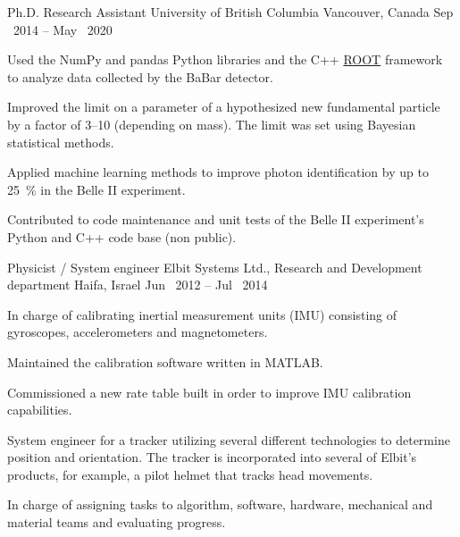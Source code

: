 

\begin{cventries}

    \cventryWithTags
    {Ph.D. Research Assistant} %
    {University of British Columbia} %
    {Vancouver, Canada} %
    {Sep \ 2014 -- May \ 2020} %
    {         \fbox{\LaTeX}} %
    {
      \begin{cvitems} %
      \item {Used the NumPy and pandas Python libraries and the C++ \hypersetup{urlcolor=blue}\href{https://root.cern.ch/}{ROOT} framework to analyze data collected by the BaBar detector.}
      \item {Improved the limit on a parameter of a hypothesized new fundamental particle by a factor of 3--10 (depending on mass). The limit was set using Bayesian statistical methods.}
        \item {Applied machine learning methods to improve photon identification by up to \SI{25}{\percent} in the Belle II experiment.}
        \item {Contributed to code maintenance and unit tests of the Belle II experiment's Python and C++ code base (non public).}
      \end{cvitems}
    }

    \cventryWithTags
    {Physicist / System engineer} %
    {Elbit Systems Ltd., Research and Development department} %
    {Haifa, Israel} %
    {Jun \ 2012 -- Jul \ 2014} %
    {  }
    {
      \begin{cvitems} %
        \item {In charge of calibrating inertial measurement units (IMU) consisting of gyroscopes, accelerometers and magnetometers.}
        \item {Maintained the calibration software written in MATLAB.}
        \item {Commissioned a new rate table built in order to improve IMU calibration capabilities.}
        \item {System engineer for a tracker utilizing several different
          technologies to determine position and orientation. The tracker is incorporated into several of Elbit's products, for example, a pilot helmet that tracks head movements.}
        \item {In charge of assigning tasks to algorithm, software, hardware, mechanical and material teams and evaluating progress.}
      \end{cvitems}
    }


\end{cventries}
